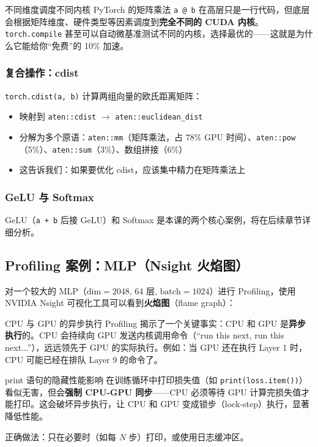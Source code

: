 \documentclass[a4paper]{article}
\begin{document}
\begin{knowledgebox}{不同维度调度不同内核}
PyTorch 的矩阵乘法 \texttt{a @ b} 在高层只是一行代码，但底层会根据矩阵维度、硬件类型等因素调度到\textbf{完全不同的 CUDA 内核}。\texttt{torch.compile} 甚至可以自动微基准测试不同的内核，选择最优的——这就是为什么它能给你``免费''的 10\% 加速。
\end{knowledgebox}

\subsubsection{复合操作：cdist}

\texttt{torch.cdist(a, b)} 计算两组向量的欧氏距离矩阵：
\begin{itemize}
    \item 映射到 \texttt{aten::cdist} $\rightarrow$ \texttt{aten::euclidean\_dist}
    \item 分解为多个原语：\texttt{aten::mm}（矩阵乘法，占 78\% GPU 时间）、\texttt{aten::pow}（5\%）、\texttt{aten::sum}（3\%）、数组拼接（6\%）
    \item 这告诉我们：如果要优化 cdist，应该集中精力在矩阵乘法上
\end{itemize}

\subsubsection{GeLU 与 Softmax}

GeLU（\texttt{a + b} 后接 GeLU）和 Softmax 是本课的两个核心案例，将在后续章节详细分析。

\subsection{Profiling 案例：MLP（Nsight 火焰图）}

对一个较大的 MLP（$\text{dim}=2048$, 64 层, $\text{batch}=1024$）进行 Profiling，使用 NVIDIA Nsight 可视化工具可以看到\textbf{火焰图}（flame graph）：

\begin{knowledgebox}{CPU 与 GPU 的异步执行}
Profiling 揭示了一个关键事实：CPU 和 GPU 是\textbf{异步执行}的。CPU 会持续向 GPU 发送内核调用命令（``run this next, run this next...''），远远领先于 GPU 的实际执行。例如：当 GPU 还在执行 Layer 1 时，CPU 可能已经在排队 Layer 9 的命令了。
\end{knowledgebox}

\begin{warningbox}{print 语句的隐藏性能影响}
在训练循环中打印损失值（如 \texttt{print(loss.item())}）看似无害，但会\textbf{强制 CPU-GPU 同步}——CPU 必须等待 GPU 计算完损失值才能打印。这会破坏异步执行，让 CPU 和 GPU 变成锁步（lock-step）执行，显著降低性能。

正确做法：只在必要时（如每 $N$ 步）打印，或使用日志缓冲区。
\end{warningbox}
\end{document}
